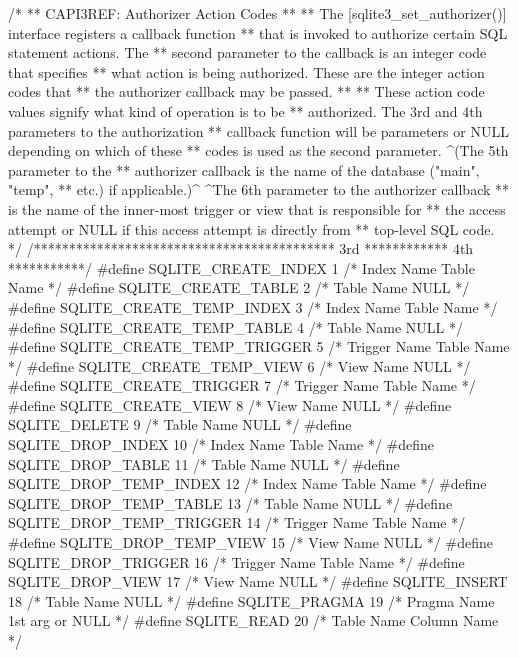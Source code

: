 \begin{Codex}[label=sqlite3.h,numbers=left]
{/*
** CAPI3REF: Authorizer Action Codes
**
** The [sqlite3_set_authorizer()] interface registers a callback function
** that is invoked to authorize certain SQL statement actions.  The
** second parameter to the callback is an integer code that specifies
** what action is being authorized.  These are the integer action codes that
** the authorizer callback may be passed.
**
** These action code values signify what kind of operation is to be
** authorized.  The 3rd and 4th parameters to the authorization
** callback function will be parameters or NULL depending on which of these
** codes is used as the second parameter.  ^(The 5th parameter to the
** authorizer callback is the name of the database ("main", "temp",
** etc.) if applicable.)^  ^The 6th parameter to the authorizer callback
** is the name of the inner-most trigger or view that is responsible for
** the access attempt or NULL if this access attempt is directly from
** top-level SQL code.
*/
/******************************************* 3rd ************ 4th ***********/
#define SQLITE_CREATE_INDEX          1   /* Index Name      Table Name      */
#define SQLITE_CREATE_TABLE          2   /* Table Name      NULL            */
#define SQLITE_CREATE_TEMP_INDEX     3   /* Index Name      Table Name      */
#define SQLITE_CREATE_TEMP_TABLE     4   /* Table Name      NULL            */
#define SQLITE_CREATE_TEMP_TRIGGER   5   /* Trigger Name    Table Name      */
#define SQLITE_CREATE_TEMP_VIEW      6   /* View Name       NULL            */
#define SQLITE_CREATE_TRIGGER        7   /* Trigger Name    Table Name      */
#define SQLITE_CREATE_VIEW           8   /* View Name       NULL            */
#define SQLITE_DELETE                9   /* Table Name      NULL            */
#define SQLITE_DROP_INDEX           10   /* Index Name      Table Name      */
#define SQLITE_DROP_TABLE           11   /* Table Name      NULL            */
#define SQLITE_DROP_TEMP_INDEX      12   /* Index Name      Table Name      */
#define SQLITE_DROP_TEMP_TABLE      13   /* Table Name      NULL            */
#define SQLITE_DROP_TEMP_TRIGGER    14   /* Trigger Name    Table Name      */
#define SQLITE_DROP_TEMP_VIEW       15   /* View Name       NULL            */
#define SQLITE_DROP_TRIGGER         16   /* Trigger Name    Table Name      */
#define SQLITE_DROP_VIEW            17   /* View Name       NULL            */
#define SQLITE_INSERT               18   /* Table Name      NULL            */
#define SQLITE_PRAGMA               19   /* Pragma Name     1st arg or NULL */
#define SQLITE_READ                 20   /* Table Name      Column Name     */
}
\end{Codex}
